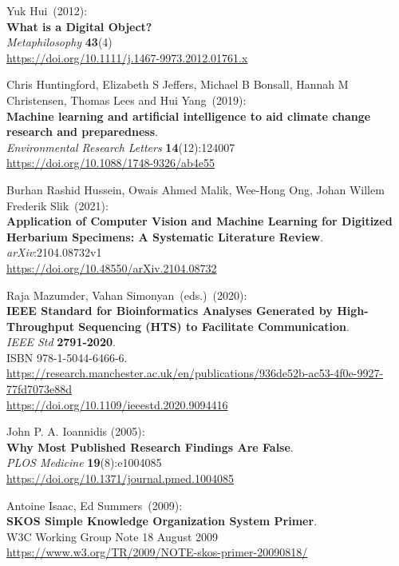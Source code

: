 \begin{thebibliography}{9}
Yuk Hui~(2012): \\
\textbf{What is a Digital Object?}\\
\emph{Metaphilosophy} \textbf{43}(4)\\
\url{https://doi.org/10.1111/j.1467-9973.2012.01761.x}

Chris Huntingford, Elizabeth S Jeffers, Michael B Bonsall, Hannah M Christensen, Thomas Lees and Hui Yang~(2019): \\
\textbf{Machine learning and artificial intelligence to aid climate change research and preparedness}.\\
\emph{Environmental Research Letters} \textbf{14}(12):124007\\
\url{https://doi.org/10.1088/1748-9326/ab4e55}

Burhan Rashid Hussein, Owais Ahmed Malik, Wee-Hong Ong, Johan Willem Frederik Slik~(2021): \\
\textbf{Application of Computer Vision and Machine Learning for Digitized Herbarium Specimens: A Systematic Literature Review}.\\
\emph{arXiv}:2104.08732v1\\
\url{https://doi.org/10.48550/arXiv.2104.08732}

Raja Mazumder, Vahan Simonyan~(eds.)~(2020): \\
\textbf{IEEE Standard for Bioinformatics Analyses Generated by High-Throughput Sequencing (HTS) to Facilitate Communication}.\\
\emph{IEEE Std} \textbf{2791-2020}.\\
ISBN 978-1-5044-6466-6.\\
\url{https://research.manchester.ac.uk/en/publications/936de52b-ac53-4f0e-9927-77fd7073e88d}\\
\url{https://doi.org/10.1109/ieeestd.2020.9094416}

John P. A. Ioannidis (2005): \\
\textbf{Why Most Published Research Findings Are False}. \\
\emph{PLOS Medicine} \textbf{19}(8):e1004085 \\
\url{https://doi.org/10.1371/journal.pmed.1004085}

Antoine Isaac, Ed Summers~(2009): \\
\textbf{SKOS Simple Knowledge Organization System Primer}. \\
W3C Working Group Note 18 August 2009 \\
\url{https://www.w3.org/TR/2009/NOTE-skos-primer-20090818/}


\end{thebibliography}
